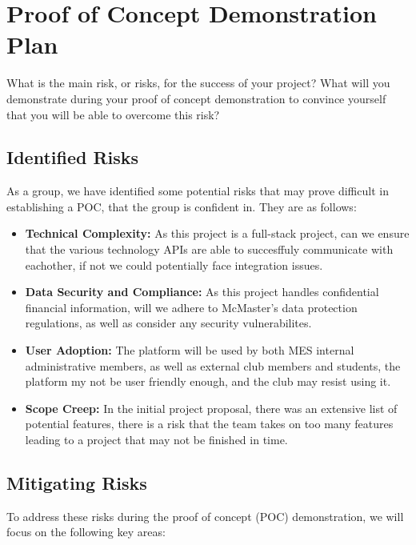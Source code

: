\documentclass{article}
\begin{document}
\section{Proof of Concept Demonstration Plan}

What is the main risk, or risks, for the success of your project?  What will you
demonstrate during your proof of concept demonstration to convince yourself that
you will be able to overcome this risk?

\subsection*{Identified Risks}

As a group, we have identified some potential risks that may prove difficult in establishing a POC, that the group is confident in. They are as follows:
\begin{itemize}
    \item \textbf{Technical Complexity:} As this project is a full-stack project, can we ensure that the various technology APIs are able to succesffuly communicate with eachother, if not we could potentially face integration issues.
    \item \textbf{Data Security and Compliance:} As this project handles confidential financial information, will we adhere to McMaster's data protection regulations, as well as consider any security vulnerabilites. 
    \item \textbf{User Adoption:} The platform will be used by both MES internal administrative members, as well as external club members and students, the platform my not be user friendly enough, and the club may resist using it.
    \item \textbf{Scope Creep:} In the initial project proposal, there was an extensive list of potential features, there is a risk that the team takes on too many features leading to a project that may not be finished in time. 
\end{itemize}

\subsection*{Mitigating Risks}
To address these risks during the proof of concept (POC) demonstration, we will focus on the following key areas:
\end{document}
